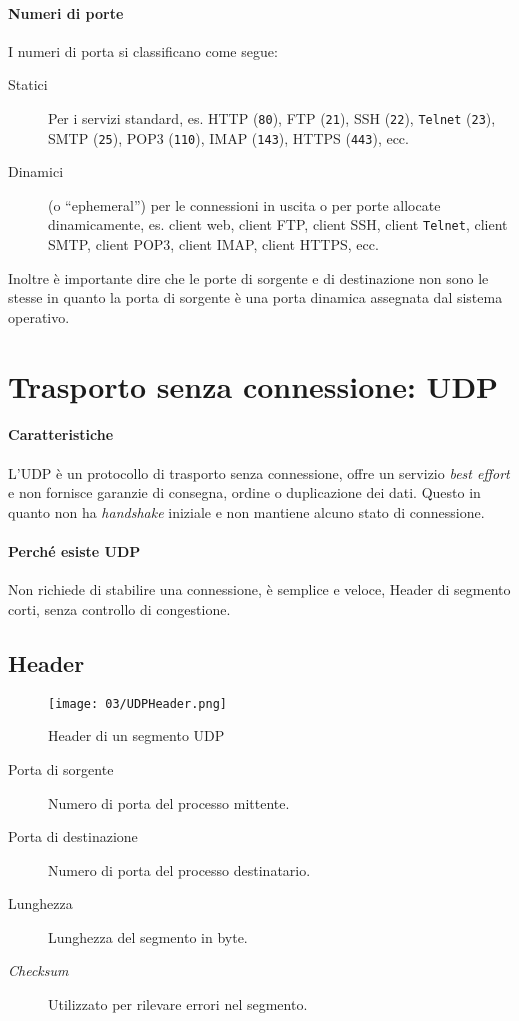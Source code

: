         \paragraph{Numeri di porte}
            I numeri di porta si classificano come segue:
            \begin{description}
                \item[Statici] Per i servizi standard, es. \Acrshort*{HTTP} (\texttt{80}), \Acrshort*{FTP} (\texttt{21}), \Acrshort*{SSH} (\texttt{22}), \texttt{Telnet} (\texttt{23}), \Acrshort*{SMTP} (\texttt{25}), \Acrshort*{POP3} (\texttt{110}), \Acrshort*{IMAP} (\texttt{143}), \Acrshort*{HTTPS} (\texttt{443}), ecc.
                \item[Dinamici] (o ``ephemeral'') per le connessioni in uscita o per porte allocate dinamicamente, es. client web, client \Acrshort*{FTP}, client \Acrshort*{SSH}, client \texttt{Telnet}, client \Acrshort*{SMTP}, client \Acrshort*{POP3}, client \Acrshort*{IMAP}, client \Acrshort*{HTTPS}, ecc.
            \end{description}
            Inoltre è importante dire che le porte di sorgente e di destinazione non sono le stesse in quanto la porta di sorgente è una porta dinamica assegnata dal sistema operativo.
\section[Trasporto senza connessione: \texttt{UDP}]{Trasporto senza connessione: \Acrshort*{UDP}}
    \paragraph{Caratteristiche} L'\Acrfull*{UDP} è un protocollo di trasporto senza connessione, offre un servizio \textit{best effort} e non fornisce garanzie di consegna, ordine o duplicazione dei dati. Questo in quanto non ha \textit{handshake} iniziale e non mantiene alcuno stato di connessione. 
    \paragraph{Perché esiste \Acrshort*{UDP}} Non richiede di stabilire una connessione, è semplice e veloce, Header di segmento corti, senza controllo di congestione.
    \subsection{Header}
        \begin{figure}[H]
            \centering
            \texttt{[image: 03/UDPHeader.png]}
            \caption{Header di un segmento \Acrshort*{UDP}}
        \end{figure}
        \begin{description}
            \item[Porta di sorgente] Numero di porta del processo mittente.
            \item[Porta di destinazione] Numero di porta del processo destinatario.
            \item[Lunghezza] Lunghezza del segmento in byte.
            \item[\textit{Checksum}] Utilizzato per rilevare errori nel segmento.
        \end{description}
